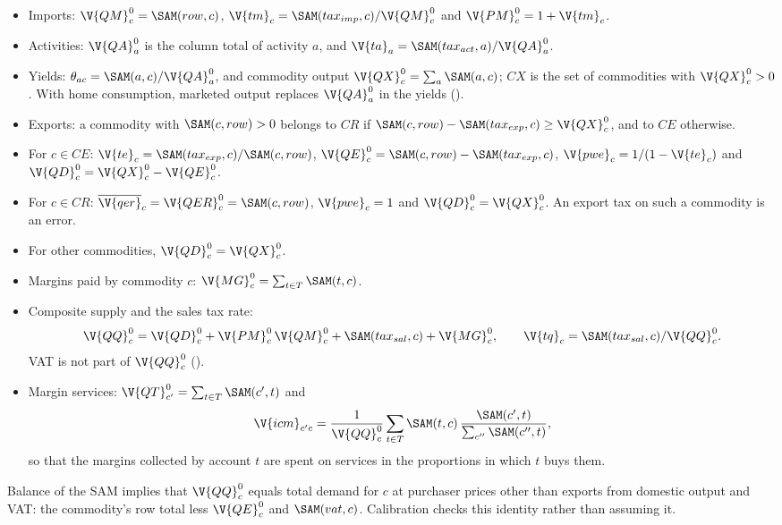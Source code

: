 \begin{itemize}
\item Imports: $\V{QM}^0_c = \SAM(row, c)$, $\V{tm}_c = \SAM(tax_{imp}, c) / \V{QM}^0_c$
and $\V{PM}^0_c = 1 + \V{tm}_c$.
\item Activities: $\V{QA}^0_a$ is the column total of activity $a$, and
$\V{ta}_a = \SAM(tax_{act}, a) / \V{QA}^0_a$.
\item Yields: $\theta_{ac} = \SAM(a, c) / \V{QA}^0_a$, and commodity output
$\V{QX}^0_c = \sum_a \SAM(a, c)$; $CX$ is the set of commodities with
$\V{QX}^0_c > 0$. With home consumption, marketed output replaces
$\V{QA}^0_a$ in the yields ().
\item Exports: a commodity with $\SAM(c, row) > 0$ belongs to $CR$ if
$\SAM(c, row) - \SAM(tax_{exp}, c) \ge \V{QX}^0_c$, and to $CE$ otherwise.
\item For $c \in CE$: $\V{te}_c = \SAM(tax_{exp}, c) / \SAM(c, row)$,
$\V{QE}^0_c = \SAM(c, row) - \SAM(tax_{exp}, c)$, $\V{pwe}_c = 1/(1 - \V{te}_c)$
and $\V{QD}^0_c = \V{QX}^0_c - \V{QE}^0_c$.
\item For $c \in CR$: $\overline{\V{qer}}_c = \V{QER}^0_c = \SAM(c, row)$,
$\V{pwe}_c = 1$ and $\V{QD}^0_c = \V{QX}^0_c$. An export tax on such a commodity
is an error.
\item For other commodities, $\V{QD}^0_c = \V{QX}^0_c$.
\item Margins paid by commodity $c$: $\V{MG}^0_c = \sum_{t \in T} \SAM(t, c)$.
\item Composite supply and the sales tax rate:
\begin{equation*}
\V{QQ}^0_c = \V{QD}^0_c + \V{PM}^0_c\,\V{QM}^0_c + \SAM(tax_{sal}, c) + \V{MG}^0_c,
\qquad \V{tq}_c = \SAM(tax_{sal}, c) / \V{QQ}^0_c .
\end{equation*}
VAT is not part of
$\V{QQ}^0_c$ ().
\item Margin services: $\V{QT}^0_{c'} = \sum_{t \in T} \SAM(c', t)$ and
\begin{equation*}
\V{icm}_{c'c} = \frac{1}{\V{QQ}^0_c} \sum_{t \in T} \SAM(t, c)\,\frac{\SAM(c', t)}{\sum_{c''} \SAM(c'', t)},
\end{equation*}
so that the margins collected by account $t$ are spent on services in the
proportions in which $t$ buys them.
\end{itemize}
Balance of the SAM implies that $\V{QQ}^0_c$ equals total demand for $c$ at
purchaser prices other than exports from domestic output and VAT: the
commodity's row total less $\V{QE}^0_c$ and $\SAM(vat, c)$. Calibration checks
this identity rather than assuming it.

